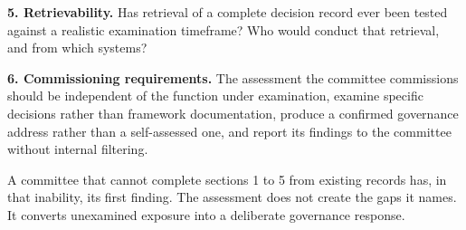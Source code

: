 \textbf{5. Retrievability.} Has retrieval of a complete decision record ever been tested against a realistic examination timeframe? Who would conduct that retrieval, and from which systems?

\textbf{6. Commissioning requirements.} The assessment the committee commissions should be independent of the function under examination, examine specific decisions rather than framework documentation, produce a confirmed governance address rather than a self-assessed one, and report its findings to the committee without internal filtering.

A committee that cannot complete sections 1 to 5 from existing records has, in that inability, its first finding. The assessment does not create the gaps it names. It converts unexamined exposure into a deliberate governance response.
